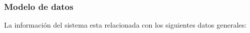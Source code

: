 \subsubsection{Modelo de datos}

\noindent
La información del sistema esta relacionada con los siguientes datos generales:

